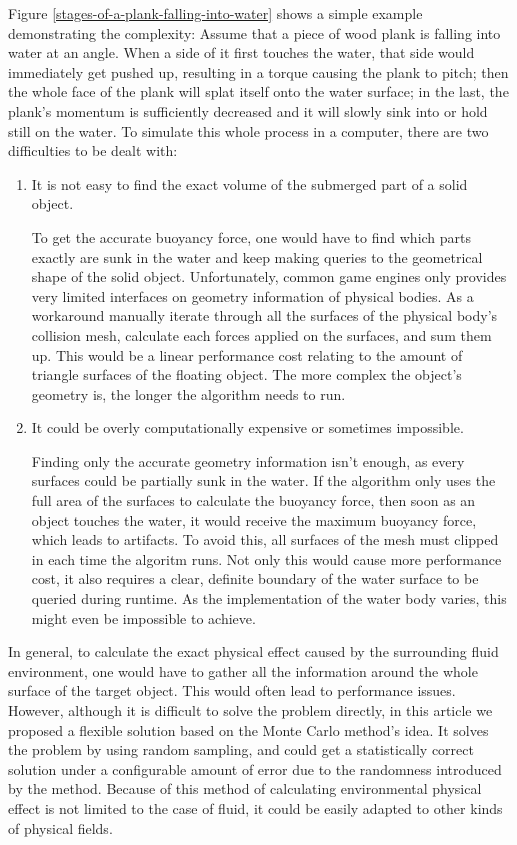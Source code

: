 Figure \ref{stages-of-a-plank-falling-into-water} shows a simple example demonstrating the complexity:
Assume that a piece of wood plank is falling into water at an angle.
When a side of it first touches the water, that side would immediately get pushed up, resulting in a torque causing the plank to pitch;
then the whole face of the plank will splat itself onto the water surface;
in the last, the plank's momentum is sufficiently decreased and it will slowly sink into or hold still on the water.
To simulate this whole process in a computer, there are two difficulties to be dealt with:

\begin{enumerate}
	\item It is not easy to find the exact volume of the submerged part of a solid object.

		To get the accurate buoyancy force, one would have to find which parts exactly are sunk in the water and keep making queries to the geometrical shape of the solid object.
		Unfortunately, common game engines only provides very limited interfaces on geometry information of physical bodies.
		As a workaround manually iterate through all the surfaces of the physical body's collision mesh, calculate each forces applied on the surfaces, and sum them up.
		This would be a linear performance cost relating to the amount of triangle surfaces of the floating object.
		The more complex the object's geometry is, the longer the algorithm needs to run.

	\item It could be overly computationally expensive or sometimes impossible.

		Finding only the accurate geometry information isn't enough, as every surfaces could be partially sunk in the water.
		If the algorithm only uses the full area of the surfaces to calculate the buoyancy force, then soon as an object touches the water, it would receive the maximum buoyancy force, which leads to artifacts.
		To avoid this, all surfaces of the mesh must clipped in each time the algoritm runs.
		Not only this would cause more performance cost, it also requires a clear, definite boundary of the water surface to be queried during runtime.
		As the implementation of the water body varies, this might even be impossible to achieve.
\end{enumerate}

In general, to calculate the exact physical effect caused by the surrounding fluid environment, one would have to gather all the information around the whole surface of the target object.
This would often lead to performance issues.
However, although it is difficult to solve the problem directly, in this article we proposed a flexible solution based on the Monte Carlo method's idea.
It solves the problem by using random sampling, and could get a statistically correct solution under a configurable amount of error due to the randomness introduced by the method.
Because of this method of calculating environmental physical effect is not limited to the case of fluid, it could be easily adapted to other kinds of physical fields.